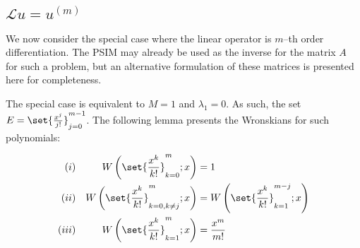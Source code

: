 \documentclass{article}
\begin{document}
\subsection{$\mathcal{L} u = u^{(m)}$}

\newcommand{\Wpoly}[2]{\W{\set{\Poly{k}}_{#1}^{#2}}{x}}

We now consider the special case where the linear operator is $m$--th order differentiation.
The PSIM may already be used as the inverse for the matrix $A$ for such a problem, but an alternative formulation of these matrices is presented here for completeness.

The special case is equivalent to $M=1$ and $\lambda_1 = 0$.
As such, the set $E = \set{\Poly{j}}_{j=0}^{m-1}$.
The following lemma presents the Wronskians for such polynomials:

\begin{lemma}
\begin{align*}
(i) && \Wpoly{k=0}{m} & = 1 \\
(ii) && \Wpoly{k=0,k \neq j}{m} & = \Wpoly{k=1}{m-j} \\
(iii) && \Wpoly{k=1}{m} & = \Poly{m}
\end{align*}
\label{lem:poly}
\end{lemma}
\end{document}
